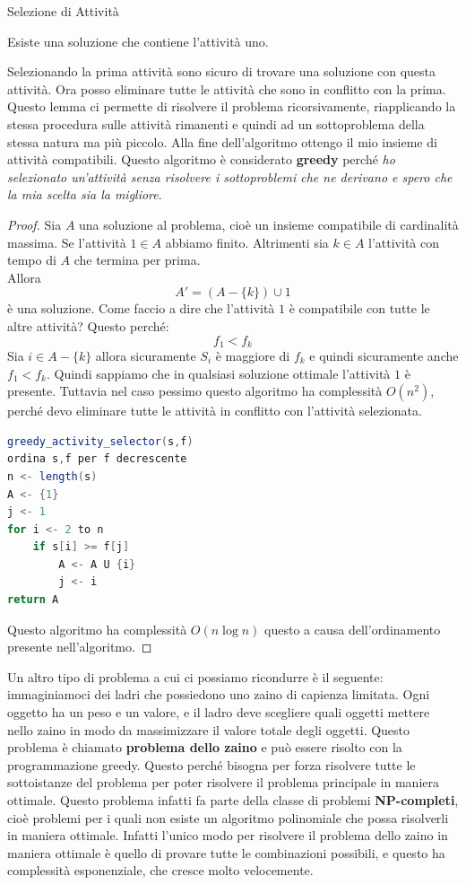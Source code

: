 \documentclass[a4paper]{article}
\begin{document}
\begin{examplebox}{Selezione di Attività}
\begin{lemma}
  Esiste una soluzione che contiene l'attività uno.
\end{lemma}
Selezionando la prima attività sono sicuro di trovare una soluzione con questa attività. Ora posso eliminare tutte le attività che sono in conflitto con la prima.
Questo lemma ci permette di risolvere il problema ricorsivamente, riapplicando la stessa procedura sulle attività rimanenti e quindi ad un sottoproblema della stessa
natura ma più piccolo. Alla fine dell'algoritmo ottengo il mio insieme di attività compatibili. 
Questo algoritmo è considerato \textbf{greedy} perché \textit{ho selezionato un'attività senza risolvere i sottoproblemi che ne derivano e spero che la mia scelta sia la migliore}.
\begin{proof}
  Sia $A$ una soluzione al problema, cioè un insieme compatibile di cardinalità massima. 
  Se l'attività $1 \in A$ abbiamo finito. Altrimenti sia $k \in A$ l'attività con tempo di $A$ che termina per prima.
  \\
  Allora \[A' = (A - \{k\}) \cup {1}\] è una soluzione. Come faccio a dire che l'attività $1$ è compatibile con tutte le altre attività?
  Questo perché:
  \[f_1 < f_k\] 
  Sia $i \in A - \{k\}$ allora sicuramente $S_i$ è maggiore di $f_k$ e quindi sicuramente anche $f_1 < f_k$.
  Quindi sappiamo che in qualsiasi soluzione ottimale l'attività $1$ è presente.
  Tuttavia nel caso pessimo questo algoritmo ha complessità $O(n^2)$, perché devo eliminare tutte le attività in conflitto con l'attività selezionata.
  \begin{lstlisting}[language=Scala]
greedy_activity_selector(s,f)
ordina s,f per f decrescente
n <- length(s)
A <- {1}
j <- 1
for i <- 2 to n 
    if s[i] >= f[j]
        A <- A U {i}
        j <- i
return A
  \end{lstlisting}
Questo algoritmo ha complessità $O(n\log n)$ questo a causa dell'ordinamento presente nell'algoritmo.
\end{proof}
\end{examplebox}
\noindent
Un altro tipo di problema a cui ci possiamo ricondurre è il seguente: immaginiamoci dei ladri
che possiedono uno zaino di capienza limitata. Ogni oggetto ha un peso e un valore, e il ladro 
deve scegliere quali oggetti mettere nello zaino in modo da massimizzare il valore totale degli oggetti.
Questo problema è chiamato \textbf{problema dello zaino} e può essere risolto con la programmazione greedy.
Questo perché bisogna per forza risolvere tutte le sottoistanze del problema per poter risolvere il problema principale in maniera ottimale.
Questo problema infatti fa parte della classe di problemi \textbf{NP-completi}, cioè problemi per i quali non esiste un algoritmo polinomiale che possa risolverli in maniera ottimale.
Infatti l'unico modo per risolvere il problema dello zaino in maniera ottimale è quello di provare tutte le combinazioni possibili, e questo ha complessità esponenziale, che cresce molto velocemente.
\end{document}
